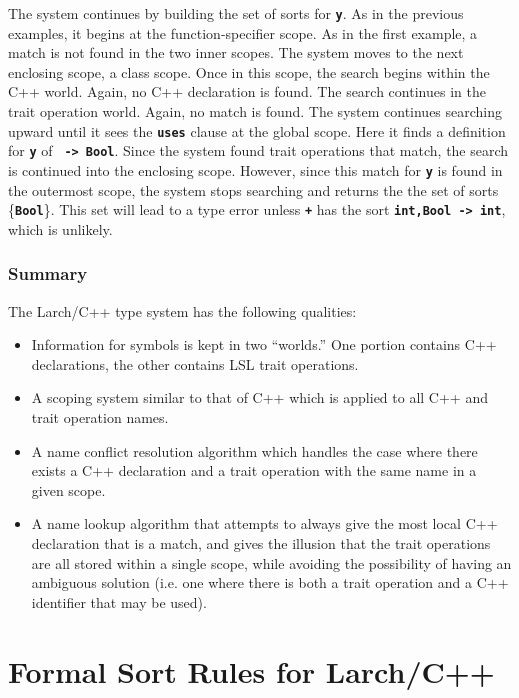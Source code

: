 \documentclass[12pt]{article} %
\newcommand{\reserved}[1]{\textbf{\texttt{#1}}} %
\begin{document}
The system continues by building the set of sorts for
\reserved{y}. As in the previous examples, it begins at the
function-specifier scope. As in the first example, a match is not
found in the two inner scopes. The system moves to the next enclosing
scope, a class scope. Once in this scope, the search begins within the
C++ world. Again, no C++ declaration is found. The search continues in
the trait operation world. Again, no match is found. The system
continues searching upward until it sees the \reserved{uses} clause at
the global scope. Here it finds a definition for \reserved{y} of
\reserved{ -> Bool}.  Since the system found trait operations that
match, the search is continued into the enclosing scope. However,
since this match for \reserved{y} is found in the outermost scope, the
system stops searching and returns the the set of sorts
\{\reserved{Bool}\}. This set will lead to a type error unless \reserved{+}
has the sort \reserved{int,Bool -> int}, which is unlikely. 

\subsubsection{Summary}
The Larch/C++ type system has the following qualities:

\begin{itemize}

\item Information for symbols is kept in two ``worlds.'' One portion
contains C++ declarations, the other contains LSL trait operations.

\item A scoping system similar to that of C++ which is applied to all
C++ and trait operation names.

\item A name conflict resolution algorithm which handles the case
where there exists a C++ declaration and a trait operation with the same
name in a given scope.

\item A name lookup algorithm that attempts to always give the most
local C++ declaration that is a match, and gives the illusion that the
trait operations are all stored within a single scope, while avoiding
the possibility of having an ambiguous solution (i.e. one where there
is both a trait operation and a C++ identifier that may be used).

\end{itemize}

\section{Formal Sort Rules for Larch/C++}
\label{typerules}
\end{document}
